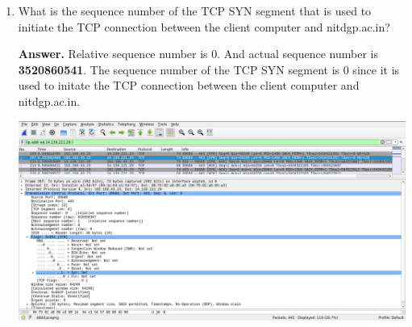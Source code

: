 \documentclass{article}
\begin{document}
\begin{enumerate}
\begin{enumerate}
\begin{lstlisting}
      iband(s,"In the beginning");
      sleep(1);
      iband(s,"Linus begat Linux,");
      sleep(1);

      iband(s,"and the Penguins");
      sleep(1);

      oband(s,"rejoiced");
      sleep(1);

      iband(s,"exceedingly.");
      close(s);

      return 0;
  }

\end{lstlisting}

\begin{lstlisting}

/* tcpserver01.c */ 

#include "bindacpt.h"
#include <stdio.h>
#include <unistd.h>
#include <stdlib.h>
#include <errno.h>
#include <string.h>
#include <signal.h>
#include <fcntl.h>
#include <sys/types.h>
#include <sys/socket.h>
#include <netinet/in.h>
#include <arpa/inet.h>
#include <netdb.h>
#include <ctype.h>  

int listenfd;

int	main(int argc, char **argv)
{
	int	n;
	int z;
	char buf[256];
	listenfd = BindAccept(argc >= 2? argv[1]: "127.0.0.1:9011");
	z = fcntl(listenfd,F_SETOWN,getpid());
	if ( z == -1 ) bail("fcntl(2)");
	signal(SIGURG,sigurg);
	for (;;) {
          z = recv(listenfd,buf,sizeof buf,0);
          if ( z == -1 )
              bail("recv(2)");
          if ( z == 0 )
              break;
          buf[z] = 0;

          printf("rcv '%s' (%d)\n",
              buf, z);
     }
	  close(listenfd);
	  return 0;
	exit(0);
}

\end{lstlisting}
\pagebreak
\item What is the sequence number of the TCP SYN segment that is used to initiate the TCP
connection between the client computer and nitdgp.ac.in?

\textbf{Answer.} Relative sequence number is 0. And actual sequence number is \textbf{3520860541}. The sequence number	of the TCP SYN segment is 0	since it is used to initate	the	TCP	connection between the client computer and	nitdgp.ac.in.	

\includegraphics[width=700pt]{Question3D}


\end{enumerate}
\end{enumerate}
\end{document}
